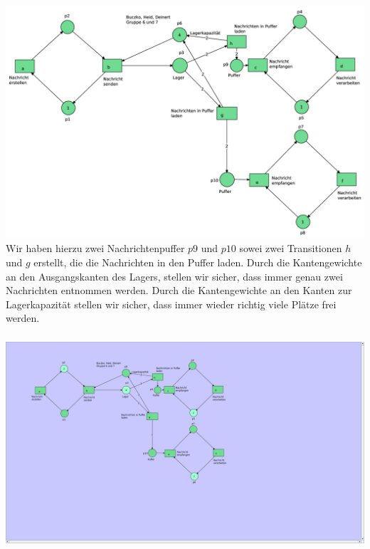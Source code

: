 \documentclass[a4paper,12pt]{scrartcl}
\begin{document}
\subsubsection{}
\includegraphics[scale=0.4]{6_4_4.png}
\\
Wir haben hierzu zwei Nachrichtenpuffer $p9$ und $p10$ sowei zwei 
Transitionen $h$ und $g$ erstellt, die die Nachrichten in den Puffer 
laden. Durch die Kantengewichte an den Ausgangskanten des Lagers, 
stellen wir sicher, dass immer genau zwei Nachrichten entnommen 
werden. Durch die Kantengewichte an den Kanten zur Lagerkapazität 
stellen wir sicher, dass immer wieder richtig viele Plätze frei 
werden. 

\subsubsection{}
\includegraphics[scale=0.4]{6_4_5.png}
\subsection{}
\subsubsection{}
\end{document}

